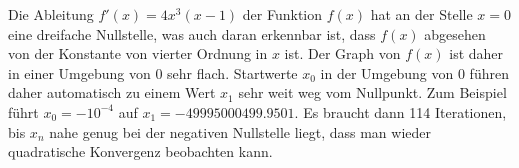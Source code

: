 \begin{loesung}
Die Ableitung $f'(x)=4x^3(x-1)$ der Funktion $f(x)$ hat an der Stelle 
$x=0$ eine dreifache Nullstelle, was auch daran erkennbar ist, dass 
$f(x)$ abgesehen von der Konstante von vierter Ordnung in $x$ ist.
Der Graph von $f(x)$ ist daher in einer Umgebung von $0$ sehr flach.
Startwerte $x_0$ in der Umgebung von $0$ führen daher automatisch
zu einem Wert $x_1$ sehr weit weg vom Nullpunkt.
Zum Beispiel führt $x_0=-10^{-4}$ auf $x_1=-49995000499.9501$.
Es braucht dann 114 Iterationen, bis $x_n$ nahe genug bei der negativen
Nullstelle liegt, dass man wieder quadratische Konvergenz beobachten kann.
\end{loesung}


